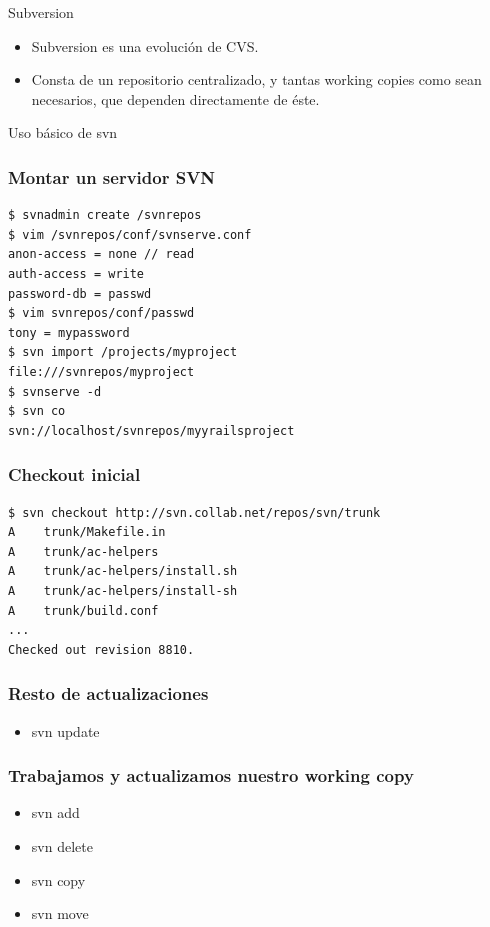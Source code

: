 \documentclass[spanish]{beamer}
\begin{document}
       \begin{frame}{Subversion}
       \begin{itemize}
        \item Subversion es una evolución de CVS.
        \item Consta de un repositorio centralizado, y tantas working copies 
         como sean necesarios, que dependen directamente de éste.
        \end{itemize}
          \end{frame}
\begin{subsection}{Uso básico de svn}
\begin{frame}[fragile]
\frametitle{Montar un servidor SVN}
%
\begin{lstlisting}
$ svnadmin create /svnrepos
$ vim /svnrepos/conf/svnserve.conf
anon-access = none // read
auth-access = write
password-db = passwd
$ vim svnrepos/conf/passwd
tony = mypassword
$ svn import /projects/myproject 
file:///svnrepos/myproject
$ svnserve -d
$ svn co 
svn://localhost/svnrepos/myyrailsproject
\end{lstlisting}
\end{frame}


\begin{frame}[fragile]
\frametitle{Checkout inicial}
\begin{lstlisting}
$ svn checkout http://svn.collab.net/repos/svn/trunk
A    trunk/Makefile.in
A    trunk/ac-helpers
A    trunk/ac-helpers/install.sh
A    trunk/ac-helpers/install-sh
A    trunk/build.conf
...
Checked out revision 8810.
\end{lstlisting}       
\end{frame}



\begin{frame}[fragile]
\frametitle{Resto de actualizaciones}
\begin{itemize}
\item svn update
\end{itemize}
\end{frame}


\begin{frame}[fragile]
\frametitle{Trabajamos y actualizamos nuestro working copy}
\begin{itemize}
\item svn add
\item svn delete
\item svn copy
\item svn move
\end{itemize}
\end{frame}



\end{subsection}
\end{document}
